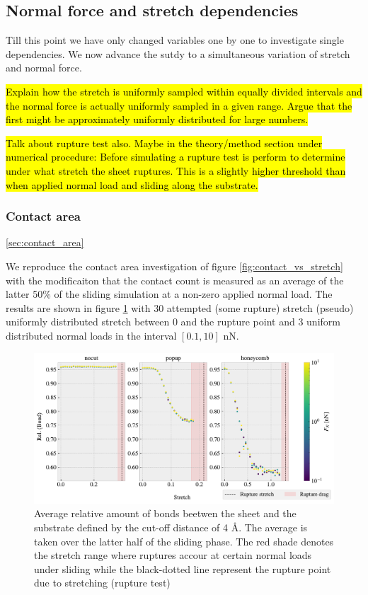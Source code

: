 \subsection{Normal force and stretch dependencies}
Till this point we have only changed variables one by one to investigate single dependencies. We now advance the sutdy to a simultaneous variation of stretch and normal force.

\hl{Explain how the stretch is uniformly sampled within equally divided intervals and the normal force is actually uniformly sampled in a given range. Argue that the first might be approximately uniformly distributed for large numbers.}

\hl{Talk about rupture test also. Maybe in the theory/method section under numerical procedure: Before simulating a rupture test is perform to determine under what stretch the sheet ruptures. This is a slightly higher threshold than when applied normal load and sliding along the substrate.}

\subsubsection{Contact area}\ref{sec:contact_area}

We reproduce the contact area investigation of figure \ref{fig:contact_vs_stretch} with the modificaiton that the contact count is measured as an average of the latter 50\% of the sliding simulation at a non-zero applied normal load. The results are shown in figure \ref{fig:multi_stretch_contact} with 30 attempted (some rupture) stretch (pseudo) uniformly distributed stretch between 0 and the rupture point and 3 uniform distributed normal loads in the interval $[0.1, 10]$ nN. 


\begin{figure}[H]
  \centering
  \includegraphics[width=\linewidth]{figures/baseline/multi_stretch_area_compare.pdf}
  \caption{Average relative amount of bonds beetwen the sheet and the substrate defined by the cut-off distance of 4 Å. The average is taken over the latter half of the sliding phase. The red shade denotes the stretch range where ruptures accour at certain normal loads under sliding while the black-dotted line represent the rupture point due to stretching (rupture test)}
  \label{fig:multi_stretch_contact}
\end{figure}

